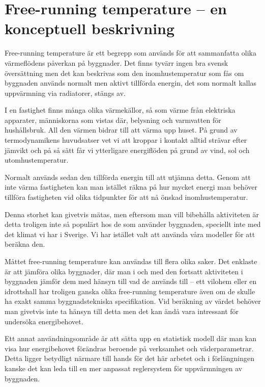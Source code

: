 \section{Free-running temperature – en konceptuell beskrivning}
\label{sec:freerunningtemp}

Free-running temperature är ett begrepp som används för att sammanfatta olika 
värmeflödens påverkan på byggnader. Det finns tyvärr ingen bra svensk översättning 
men det kan beskrivas som den inomhustemperatur som fås om byggnaden används 
normalt men aktivt tillförda energin, det som normalt kallas uppvärmning via radiatorer, 
stängs av.

I en fastighet finns många olika värmekällor, så som värme från elektriska apparater, 
människorna som vistas där, belysning och varmvatten för hushållsbruk. All den värmen
 bidrar till att värma upp huset. På grund av termodynamikens huvudsatser vet vi att 
 kroppar i kontakt alltid strävar efter jämvikt och på så sätt får vi ytterligare energiflöden på 
 grund av vind, sol och utomhustemperatur.

Normalt används sedan den tillförda energin till att utjämna detta. Genom att inte värma 
fastigheten kan man istället räkna på hur mycket energi man behöver tillföra fastigheten 
vid olika tidpunkter för att nå önskad inomhustemperatur.

Denna storhet kan givetvis mätas, men eftersom man vill bibehålla aktiviteten är detta troligen inte så populärt hos de som använder byggnaden, speciellt inte med det klimat vi har i Sverige. Vi har istället valt att använda våra modeller för att beräkna den.

Måttet free-running temperature kan användas till flera olika saker. Det enklaste är att 
jämföra olika byggnader, där man i och med den fortsatt aktiviteten i byggnaden jämför
 dem med hänsyn till vad de används till – ett vilohem eller en idrottshall har troligen 
 ganska olika free-running temperature även om de skulle ha exakt samma 
 byggnadstekniska specifikation. Vid beräkning av värdet behöver man givetvis inte ta 
 hänsyn till detta men det kan ändå vara intressant för undersöka energibehovet.

Ett annat användningsområde är att sätta upp en statistisk modell där man kan visa hur 
energibehovet förändras beroende på verksamhet och väderparametrar. Detta ligger 
betydligt närmare till hands för det här arbetet och i förlängningen kanske det kan leda till 
en mer anpassat reglersystem för uppvärmningen av byggnaden.
